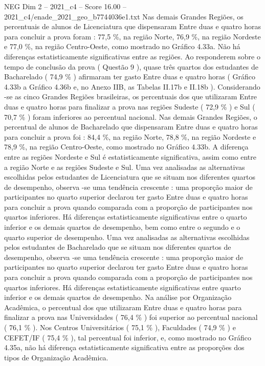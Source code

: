 \begin{textsample}{NEG Dim 2 – 2021\_c4 – Score 16.00 – 2021\_c4/enade\_2021\_geo\_b7744036e1.txt}
Nas demais Grandes Regiões, os percentuais de alunos de Licenciatura que dispensaram Entre duas e quatro horas para concluir a prova foram : 77,5 \%, na região Norte, 76,9 \%, na região Nordeste e 77,0 \%, na região Centro-Oeste, como mostrado no Gráfico 4.33a.
Não há diferenças estatisticamente significativas entre as regiões.
Ao responderem sobre o tempo de conclusão da prova ( Questão 9 ), quase três quartos dos estudantes de Bacharelado ( 74,9 \% ) afirmaram ter gasto Entre duas e quatro horas ( Gráfico 4.33b a Gráfico 4.36b e, no Anexo IIB, as Tabelas II.17b e II.18b ).
Considerando -se as cinco Grandes Regiões brasileiras, os percentuais dos que utilizaram Entre duas e quatro horas para finalizar a prova nas regiões Sudeste ( 72,9 \% ) e Sul ( 70,7 \% ) foram inferiores ao percentual nacional.
Nas demais Grandes Regiões, o percentual de alunos de Bacharelado que dispensaram Entre duas e quatro horas para concluir a prova foi : 84,4 \%, na região Norte, 78,8 \%, na região Nordeste e 78,9 \%, na região Centro-Oeste, como mostrado no Gráfico 4.33b.
A diferença entre as regiões Nordeste e Sul é estatisticamente significativa, assim como entre a região Norte e as regiões Sudeste e Sul.
Uma vez analisadas as alternativas escolhidas pelos estudantes de Licenciatura que se situam nos diferentes quartos de desempenho, observa -se uma tendência crescente : uma proporção maior de participantes no quarto superior declarou ter gasto Entre duas e quatro horas para concluir a prova quando comparada com a proporção de participantes nos quartos inferiores.
Há diferenças estatisticamente significativas entre o quarto inferior e os demais quartos de desempenho, bem como entre o segundo e o quarto superior de desempenho.
Uma vez analisadas as alternativas escolhidas pelos estudantes de Bacharelado que se situam nos diferentes quartos de desempenho, observa -se uma tendência crescente : uma proporção maior de participantes no quarto superior declarou ter gasto Entre duas e quatro horas para concluir a prova quando comparada com a proporção de participantes nos quartos inferiores.
Há diferenças estatisticamente significativas entre quarto inferior e os demais quartos de desempenho.
Na análise por Organização Acadêmica, o percentual dos que utilizaram Entre duas e quatro horas para finalizar a prova nas Universidades ( 76,4 \% ) foi superior ao percentual nacional ( 76,1 \% ).
Nos Centros Universitários ( 75,1 \% ), Faculdades ( 74,9 \% ) e CEFET/IF ( 75,4 \% ), tal percentual foi inferior, e, como mostrado no Gráfico 4.35a, não há diferença estatisticamente significativa entre as proporções dos tipos de Organização Acadêmica.

\end{textsample}
